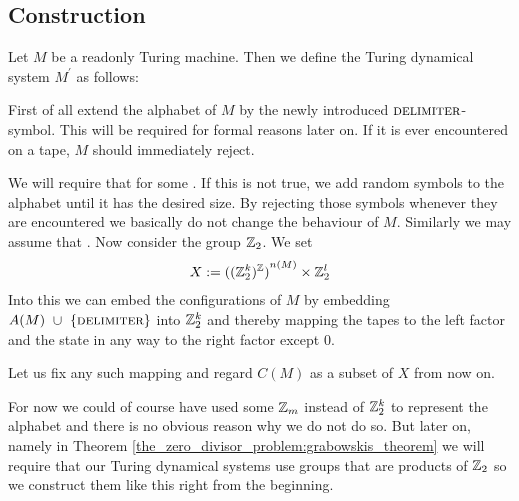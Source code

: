 \subsection{Construction}
\label{tm_to_tds:construction}

Let $M$ be a readonly Turing machine.\footnotemark
Then we define the Turing dynamical system $M^\prime$ as follows:

First of all extend the alphabet of $M$ by the newly introduced $\text{\scshape{delimiter}}$-symbol. This will be required for formal reasons later on. If it is ever encountered on a tape, $M$ should immediately reject.

We will require that  for some .
If this is not true, we add random symbols to the alphabet until it has the desired size. By rejecting those symbols whenever they are encountered we basically do not change the behaviour of $M$.
Similarly we may assume that .
Now consider the group $\mathbb{Z}_2$.
We set
\begin{align*}
	X := {{((\mathbb{Z}_2^{k})^{\mathbb{Z}})}^{n(M)}} \times \mathbb{Z}_2^l
\end{align*}
Into this we can embed the configurations of $M$ by embedding $A(M)~\cup~\{\text{\scshape{delimiter}}\}$ into $\mathbb{Z}_2^k$ and thereby mapping the tapes to the left factor and the state in any way to the right factor except $0$.

Let us fix any such mapping and regard $C(M)$ as a subset of $X$ from now on.

\begin{Remark}
	For now we could of course have used some $\mathbb{Z}_m$ instead of $\mathbb{Z}_2^k$ to represent the alphabet and there is no obvious reason why we do not do so.
	But later on, namely in Theorem \ref{the_zero_divisor_problem:grabowskis_theorem} we will require that our Turing dynamical systems use groups that are products of $\mathbb{Z}_2$ so we construct them like this right from the beginning.
\end{Remark}

